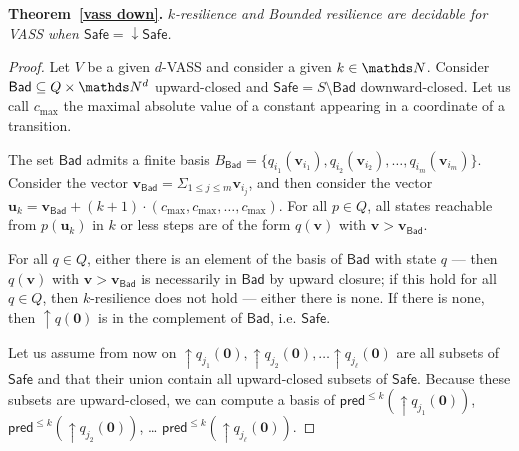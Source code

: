 \documentclass[runningheads]{llncs}
\newcommand{\mathieu}[1]{\todo[inline,color=blue!20]{{\bf MH:} #1}}
\newcommand{\pred}{\textsf{pred}}
\newcommand{\Bad}{\textsf{Bad}}
\newcommand{\Safe}{\textsf{Safe}}
\begin{document}



\noindent
\textbf{Theorem~\ref{vass down}.}
{\em {\sc $k$-resilience }  and {\sc Bounded resilience} are decidable for VASS when 
$\Safe = \mathop{\downarrow} \Safe$.
}

\begin{proof}
Let $V$ be a given $d$-VASS and consider a given $k \in \N$.
Consider $\Bad \subseteq Q \times \N^d$ upward-closed and 
$\Safe = S \setminus \Bad$
 downward-closed.
Let us call $c_{\max}$ the maximal absolute value of a constant appearing in a coordinate of a transition.

The set $\Bad$ admits a finite basis 
$B_\Bad = \{ q_{i_1}(\textbf{v}_{i_1}), q_{i_2}(\textbf{v}_{i_2}), \ldots,
q_{i_m}(\textbf{v}_{i_m}) \}$.
Consider the vector $\textbf{v}_{\Bad} = \Sigma_{1 \leq j \leq m} \textbf{v}_{i_j}$,
and then consider the vector
$\textbf{u}_k = \textbf{v}_{\Bad} + (k+1) \cdot (c_{\max}, c_{\max}, \ldots, c_{\max})$.
For all $p \in Q$, all states reachable from $p(\textbf{u}_k)$ in $k$ or less steps are 
of the form $q(\textbf{v})$ with $ \textbf{v} > \textbf{v}_{\Bad}$.

For all $q \in Q$, either there is an element of the basis of $\Bad$ with state $q$ \----
then $q(\textbf{v})$ with $\textbf{v} > \textbf{v}_{\Bad}$ is necessarily in $\Bad$ by upward closure; if this hold for all $q \in Q$, then $k$-resilience does not hold \---- either there is none. If there is none, then 
$\mathop{\uparrow} q(\textbf{0})$
 is in the complement of $\Bad$, i.e. $\Safe$.

Let us assume from now on 
 $\mathop{\uparrow} q_{j_1}(\textbf{0}), \mathop{\uparrow} q_{j_2}(\textbf{0}), \ldots \mathop{\uparrow} q_{j_\ell}(\textbf{0})$ are
all subsets of $\Safe$ and that their union contain all upward-closed subsets of $\Safe$.
Because these subsets are upward-closed, we can compute a basis of
$\pred^{\leq k}(\mathop{\uparrow} q_{j_1}(\textbf{0}))$, $\pred^{\leq k}(\mathop{\uparrow} q_{j_2}(\textbf{0}))$, \ldots
$\pred^{\leq k}(\mathop{\uparrow} q_{j_\ell}(\textbf{0}))$.



\end{proof}
\end{document}
